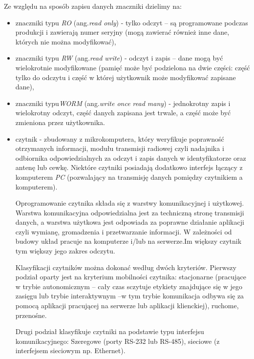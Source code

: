 \begin{itemize}
\begin{itemize}
	Ze względu na sposób zapisu danych znaczniki dzielimy na:

	\begin{itemize}\setlength{\itemsep}{0pt}

	\item znaczniki typu \emph{RO} (ang.\emph{read only}) - tylko odczyt – są programowane podczas produkcji i zawierają numer seryjny (mogą zawierać również inne dane, których nie można modyfikować), 

	\item znaczniki typu \emph{RW} (ang.\emph{read write}) - odczyt i zapis – dane mogą być wielokrotnie modyfikowane (pamięć może być podzielona na dwie części: część tylko do odczytu i część w której użytkownik może modyfikować zapisane dane),

	\item znaczniki typu\emph{WORM} (ang.\emph{write once read many}) - jednokrotny zapis i wielokrotny odczyt, część danych zapisana jest trwale, a część może być zmieniona przez użytkownika.
	
	\item czytnik - zbudowany z mikrokomputera, który weryfikuje poprawność otrzymanych informacji, modułu transmisji radiowej czyli nadajnika i odbiornika  odpowiedzialnych za odczyt i zapis danych w identyfikatorze oraz antenę lub cewkę. Niektóre czytniki posiadają dodatkowo interfejs łączący z komputerem \emph{PC} (pozwalający na transmisję danych pomiędzy czytnikiem a komputerem).
	
	Oprogramowanie czytnika składa się z warstwy komunikacyjnej i użytkowej. Warstwa komunikacyjna odpowiedzialna jest za techniczną stronę transmisji danych, a warstwa użytkowa jest odpowiada za poprawne działanie aplikacji czyli wymianę, gromadzenia i przetwarzanie informacji. W zależności od budowy układ pracuje na komputerze i/lub na serwerze.Im większy czytnik tym większy jego zakres odczytu.
	
	Klasyfikacji czytników można dokonać według dwóch kryteriów. Pierwszy podział oparty jest na kryterium mobilności czytnika: stacjonarne (pracujące w trybie autonomicznym – cały czas sczytuje etykiety znajdujące się w jego zasięgu lub trybie interaktywnym –w tym trybie komunikacja odbywa się za pomocą aplikacji pracującej na serwerze lub aplikacji klienckiej), ruchome, przenośne.
	
	Drugi podział klasyfikuje czytniki na podstawie typu interfejsu komunikacyjnego:
	Szeregowe (porty RS-232 lub RS-485), sieciowe (z interfejsem sieciowym np. Ethernet).


\end{itemize}
\end{itemize}
\end{itemize}
